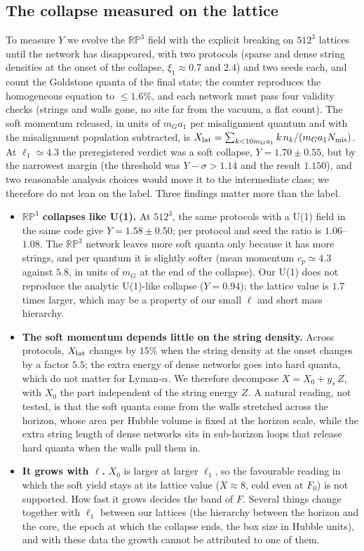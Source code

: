\documentclass[11pt,a4paper]{article}
\newcommand{\RP}{\mathbb{RP}^3}
\begin{document}
\subsection{The collapse measured on the lattice}

To measure $Y$ we evolve the $\RP$ field with the explicit breaking on $512^3$ lattices until the network has disappeared, with two protocols (sparse and dense string densities at the onset of the collapse, $\xi_1\approx0.7$ and $2.4$) and two seeds each, and count the Goldstone quanta of the final state; the counter reproduces the homogeneous equation to $\le1.6\%$, and each network must pass four validity checks (strings and walls gone, no site far from the vacuum, a flat count).
The soft momentum released, in units of $m_G a_1$ per misalignment quantum and with the misalignment population subtracted, is $X_{\rm lat}=\sum_{k<10m_Ga_1}k\,n_k/(m_Ga_1N_{\rm mis})$.
At $\ell_1\simeq4.3$ the preregistered verdict was a soft collapse, $Y=1.70\pm0.55$, but by the narrowest margin (the threshold was $Y-\sigma>1.14$ and the result $1.150$), and two reasonable analysis choices would move it to the intermediate class; we therefore do not lean on the label.
Three findings matter more than the label.
\begin{itemize}
\item \textbf{$\RP$ collapses like U(1).} At $512^3$, the same protocols with a U(1) field in the same code give $Y=1.58\pm0.50$; per protocol and seed the ratio is $1.06$--$1.08$. The $\RP$ network leaves more soft quanta only because it has more strings, and per quantum it is slightly softer (mean momentum $c_p\simeq4.3$ against $5.8$, in units of $m_G$ at the end of the collapse). Our U(1) does not reproduce the analytic U(1)-like collapse ($Y=0.94$); the lattice value is $1.7$ times larger, which may be a property of our small $\ell$ and short mass hierarchy.
\item \textbf{The soft momentum depends little on the string density.} Across protocols, $X_{\rm lat}$ changes by $15\%$ when the string density at the onset changes by a factor $5.5$; the extra energy of dense networks goes into hard quanta, which do not matter for Lyman-$\alpha$. We therefore decompose $X=X_0+y_s\,Z$, with $X_0$ the part independent of the string energy $Z$. A natural reading, not tested, is that the soft quanta come from the walls stretched across the horizon, whose area per Hubble volume is fixed at the horizon scale, while the extra string length of dense networks sits in sub-horizon loops that release hard quanta when the walls pull them in.
\item \textbf{It grows with $\ell$.} $X_0$ is larger at larger $\ell_1$, so the favourable reading in which the soft yield stays at its lattice value ($X\approx8$, cold even at $F_0$) is not supported. How fast it grows decides the band of $F$. Several things change together with $\ell_1$ between our lattices (the hierarchy between the horizon and the core, the epoch at which the collapse ends, the box size in Hubble units), and with these data the growth cannot be attributed to one of them.
\end{itemize}
\end{document}
